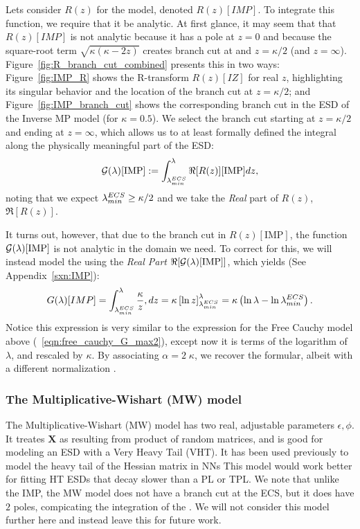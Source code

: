 Lets consider $R(z)$ for the \InverseMP model, denoted $R(z)[IMP]$.
To integrate this function, we require that it be analytic.
At first glance, it may seem that that $R(z)[IMP]$ is not analytic because it
has a pole at $z=0$ and because the square-root term $\sqrt{\kappa(\kappa-2z)}$  creates branch
cut at and $z=\kappa/2$ (and $z=\infty$).
Figure~\ref{fig:R_branch_cut_combined} presents this in two ways:
Figure~\ref{fig:IMP_R} shows the R-transform $R(z)[IZ]$ for real $z$, highlighting its singular behavior and the location of the branch cut at $z = \kappa/2$; and
Figure~\ref{fig:IMP_branch_cut} shows the corresponding branch cut in the ESD of the Inverse MP model (for $\kappa = 0.5$).
We select the branch cut starting at $z=\kappa/2$ and ending at $z=\infty$,
which allows us to at least formally defined the integral along the physically meaningful part of the ESD:
\begin{equation}
\label{eqn:IMP_model_1} 
\mathcal{G(\lambda)}[\mathrm{IMP}] := \int_{\lambda^{ECS}_{min}}^{\lambda} \Re[R(z)][\mathrm{IMP}] dz  ,
\end{equation}
noting that we expect $\lambda^{ECS}_{min}\ge\kappa/2$ and we take the \emph{Real} part of $R(z)$, $\Re[R(z)]$.

It turns out, however, that due to the branch cut in $R(z)[\mathrm{IMP}]$,
the function $\mathcal{G(\lambda)}[\mathrm{IMP}]$ is not analytic in the domain we need. 
To correct for this, we will instead model the \LayerQualitySquared using the \emph{Real Part} $\Re[\mathcal{G(\lambda)}[\mathrm{IMP}]]$,
which yields (See Appendix~\ref{sxn:IMP}):
\begin{equation}
  \label{eqn:IMP_model_2}
G(\lambda)[IMP] = \int_{\lambda^{ECS}_{min}}^\lambda \frac{\kappa}{z} , dz = \kappa \left[ \ln z \right]_{\lambda^{ECS}_{min}}^\lambda = \kappa \left( \ln \lambda - \ln \lambda^{ECS}_{min}\right).
\end{equation}
Notice this expression is very similar to the expression for the Free Cauchy model above (\EQN~\ref{eqn:free_cauchy_G_max2}), except
now it is terms of the logarithm of $\lambda$, and rescaled by $\kappa$.
By associating $\alpha=2\;\kappa$, we recover the \ALPHAHAT formular, albeit with a different normalization .

\subsubsection{The Multiplicative-Wishart (MW) model}
The Multiplicative-Wishart (MW) model  has two real, adjustable parameters $\epsilon,\phi$.
It treates $\mathbf{X}$ as resulting from product of random matrices, and is good for modeling an ESD with a Very Heavy Tail (VHT).
It has been used previously to model the heavy tail of the Hessian matrix in NNs\cite{Pennington2017}
This model would work better for fitting HT ESDs that decay slower than a PL or TPL.
We note that unlike the IMP, the MW model does not have a branch cut at the ECS, but it does
have $2$ poles, compicating the integration of the  \RTransform.
We will not consider this model further here and instead leave this for future work.



